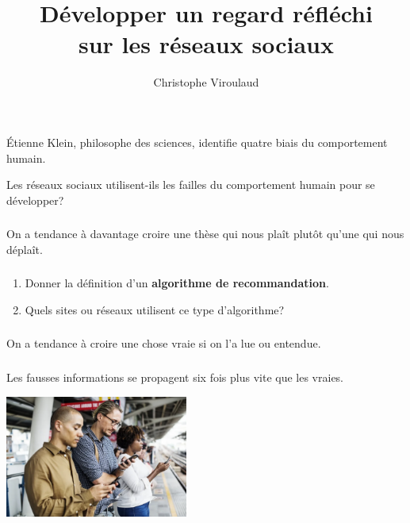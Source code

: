 \documentclass[svgnames,11pt]{beamer}
\author[]{Christophe Viroulaud}
\title{Développer un regard réfléchi\\sur les réseaux sociaux}
\date{\framebox{\textbf{ResSoc 03}}}
\institute{Seconde - SNT}
\begin{document}
\begin{frame}
\titlepage
\end{frame}
\begin{frame}

    Étienne Klein, philosophe des sciences, identifie quatre biais du comportement humain.
    \begin{framed}
        \centering Les réseaux sociaux utilisent-ils les failles du comportement humain pour se développer?
    \end{framed}
\end{frame}
\begin{frame}
    \frametitle{}

    \begin{aretenir}[Biais 1]
    \centering On a tendance à davantage croire une thèse qui nous plaît plutôt qu'une qui nous déplaît.
    \end{aretenir}
\end{frame}
\begin{frame}
    \frametitle{}

    \begin{activite}
    \begin{enumerate}
        \item Donner la définition d'un \textbf{algorithme de recommandation}.
        \item Quels sites ou réseaux utilisent ce type d'algorithme?
    \end{enumerate}
    \end{activite}
\end{frame}
\begin{frame}
    \frametitle{}

    \begin{aretenir}[Biais 2]
    \centering On a tendance à croire une chose vraie si on l'a lue ou entendue.
    \end{aretenir}
\end{frame}
\begin{frame}
    \frametitle{}
\begin{aretenir}[Proposition]
    \centering Les fausses informations se propagent six fois plus vite que les vraies.
\end{aretenir}
    \begin{center}
    \centering
    \includegraphics[width=6cm]{ressources/fakenews.png}
    \label{IMG}
    \end{center}

\end{frame}
\end{document}
